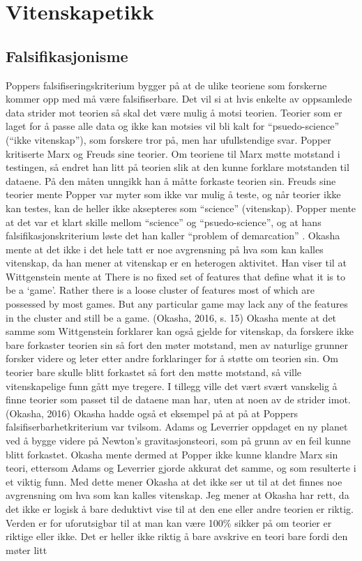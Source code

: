 \documentclass[
]{book}
\begin{document}
\hypertarget{vitenskapetikk}{%
\chapter{Vitenskapetikk}\label{vitenskapetikk}}

\hypertarget{falsifikasjonisme}{%
\section{Falsifikasjonisme}\label{falsifikasjonisme}}

Poppers falsifiseringskriterium bygger på at de ulike teoriene som forskerne kommer opp med må være falsifiserbare. Det vil si at hvis enkelte av oppsamlede data strider mot teorien så skal det være mulig å motsi teorien. Teorier som er laget for å passe alle data og ikke kan motsies vil bli kalt for ``psuedo-science'' (``ikke vitenskap''), som forskere tror på, men har ufullstendige svar. Popper kritiserte Marx og Freuds sine teorier. Om teoriene til Marx møtte motstand i testingen, så endret han litt på teorien slik at den kunne forklare motstanden til dataene. På den måten unngikk han å måtte forkaste teorien sin. Freuds sine teorier mente Popper var myter som ikke var mulig å teste, og når teorier ikke kan testes, kan de heller ikke aksepteres som ``science'' (vitenskap). Popper mente at det var et klart skille mellom ``science'' og ``psuedo-science'', og at hans falsifikasjonskriterium løste det han kaller ``problem of demarcation'' \citep{okasha2016, popper1969}. Okasha mente at det ikke i det hele tatt er noe avgrensning på hva som kan kalles vitenskap, da han mener at vitenskap er en heterogen aktivitet. Han viser til at Wittgenstein mente at There is no fixed set of features that define what it is to be a `game'. Rather there is a loose cluster of features most of which are possessed by most games. But any particular game may lack any of the features in the cluster and still be a game. (Okasha, 2016, s. 15) Okasha mente at det samme som Wittgenstein forklarer kan også gjelde for vitenskap, da forskere ikke bare forkaster teorien sin så fort den møter motstand, men av naturlige grunner forsker videre og leter etter andre forklaringer for å støtte om teorien sin. Om teorier bare skulle blitt forkastet så fort den møtte motstand, så ville vitenskapelige funn gått mye tregere. I tillegg ville det vært svært vanskelig å finne teorier som passet til de dataene man har, uten at noen av de strider imot. (Okasha, 2016) Okasha hadde også et eksempel på at på at Poppers falsifiserbarhetkriterium var tvilsom. Adams og Leverrier oppdaget en ny planet ved å bygge videre på Newton's gravitasjonsteori, som på grunn av en feil kunne blitt forkastet. Okasha mente dermed at Popper ikke kunne klandre Marx sin teori, ettersom Adams og Leverrier gjorde akkurat det samme, og som resulterte i et viktig funn. Med dette mener Okasha at det ikke ser ut til at det finnes noe avgrensning om hva som kan kalles vitenskap. Jeg mener at Okasha har rett, da det ikke er logisk å bare deduktivt vise til at den ene eller andre teorien er riktig. Verden er for uforutsigbar til at man kan være 100\% sikker på om teorier er riktige eller ikke. Det er heller ikke riktig å bare avskrive en teori bare fordi den møter litt 
\end{document}
